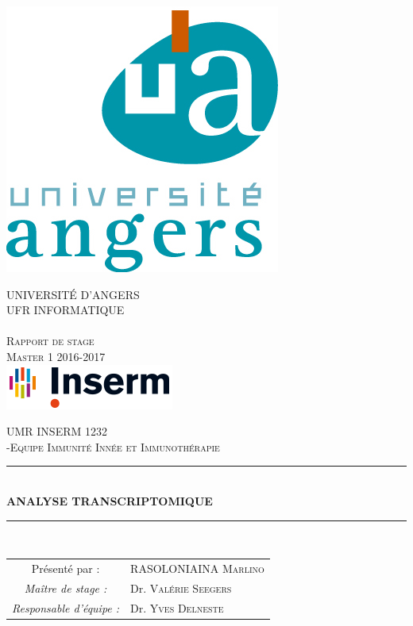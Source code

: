 \documentclass[a4paper,10pt]{article}
\newcommand\tabA[1][0.5cm]{\hspace*{#1}}
\newcommand\tabC[1][2cm]{\hspace*{#1}}
\newcommand{\HRule}{\rule{\linewidth}{0.5mm}}
\begin{document}
\begin{titlepage}
  \begin{sffamily}
  \begin{center}

    \includegraphics{./image/ua_v_couleur.jpg}
    
    \textsc{ UNIVERSIT\'{E} D'ANGERS \\ UFR INFORMATIQUE}\\[0.5cm]
    \textsc{ \\ Rapport de stage \\ Master 1 2016-2017 }\\[1.5cm]
    
    \includegraphics{./image/logo-generique-SD.png}
    
    \textsc{UMR INSERM 1232 \\-Equipe Immunité Innée et Immunothérapie}\\[1cm]
     
    \HRule \\[0.4cm]
    { \huge \bfseries ANALYSE TRANSCRIPTOMIQUE\\[0.4cm] }

    \HRule \\[2cm]
    \centering\vspace*{\fill}
    \begin{minipage}{9\textwidth}
    \begin{doublespace}
    \begin{tabular}{cl}
       \large Présenté par : &\tabC \tabA \textsc{RASOLONIAINA Marlino}\\
       \newline
       \emph{Maître de stage  :} &\tabC \tabA Dr. \textsc{Valérie Seegers}\\
       \emph{Responsable d'équipe : } &\tabC \tabA Dr.  \textsc{Yves Delneste} \\
       

\end{tabular}
\end{doublespace}
\end{minipage}
\end{center}
\end{sffamily}
\end{titlepage}
\end{document}
